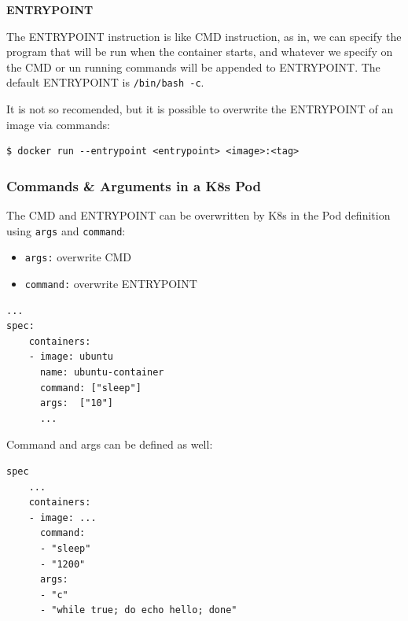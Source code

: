 \documentclass{article}
\newenvironment{blocktemplate}[1]{%
    \tcolorbox[beamer,%
    noparskip,breakable,
    colframe=Blue,%
    colbacklower=LimeGreen!75!LightGreen,%
    title=#1]}%
    {\endtcolorbox}
\newenvironment{blocktemplateII}[1]{%
    \tcolorbox[beamer,%
    noparskip,breakable,
    colframe=Green,%
    colbacklower=LimeGreen!75!LightGreen,%
    title=#1]}%
    {\endtcolorbox}
\newenvironment{codetemplate}[1][]{%
  \mybasecolorbox[#1]
  \itshape
}{%
  \endmybasecolorbox
}
\begin{document}
\textbf{ENTRYPOINT}

The ENTRYPOINT instruction is like CMD instruction, as in, we can specify the program that will be run when the container starts, and whatever we specify on the CMD or un running commands will be appended to ENTRYPOINT. The default ENTRYPOINT is \verb|/bin/bash -c|.

\begin{blocktemplate}{NOTE}
It is not so recomended, but it is possible to overwrite the ENTRYPOINT of an image via commands:
\begin{codetemplate}{}
\begin{verbatim}
$ docker run --entrypoint <entrypoint> <image>:<tag> 
\end{verbatim}
\end{codetemplate}

\end{blocktemplate}

\subsubsection{Commands \& Arguments in a K8s Pod}

The CMD and ENTRYPOINT can be overwritten by K8s in the Pod definition using \verb|args| and \verb|command|:
\begin{itemize}
    \item \verb|args:| overwrite CMD
    \item \verb|command:| overwrite ENTRYPOINT
\end{itemize}
\begin{codetemplate}{}
\begin{verbatim}
...
spec:
    containers:
    - image: ubuntu
      name: ubuntu-container
      command: ["sleep"]
      args:  ["10"]
      ... 
\end{verbatim}
\end{codetemplate}


\begin{blocktemplateII}{NOTE}
Command and args can be defined as well:
\begin{codetemplate}{}
\begin{verbatim}
spec
    ...
    containers:
    - image: ...
      command: 
      - "sleep"
      - "1200"
      args:
      - "c"
      - "while true; do echo hello; done"
\end{verbatim}
\end{codetemplate}
\end{blocktemplateII}
\end{document}
